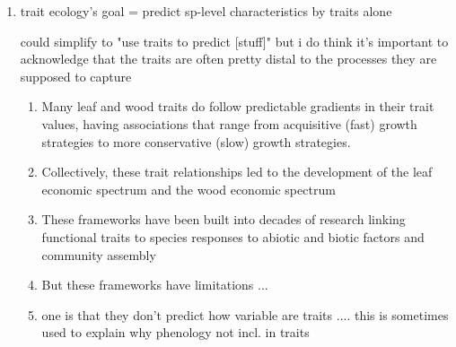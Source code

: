 \documentclass{article}
\begin{document}
\begin{enumerate}

\item trait ecology’s goal = predict sp-level characteristics by traits alone %

could simplify to "use traits to predict [stuff]" but i do think it's important to acknowledge that the traits are often pretty distal to the processes they are supposed to capture
\begin{enumerate}
\item Many leaf and wood traits do follow predictable gradients in their trait values, having associations that range from acquisitive (fast) growth strategies to more conservative (slow) growth strategies.
\item Collectively, these trait relationships led to the development of the leaf economic spectrum and the wood economic spectrum
\item These frameworks have been built into decades of research linking functional traits to species responses to abiotic and biotic factors and community assembly
\item But these frameworks have limitations ... 
\item one is that they don't predict how variable are traits .... this is sometimes used to explain why phenology not incl. in traits %
\end{enumerate}


\end{enumerate}
\end{document}
